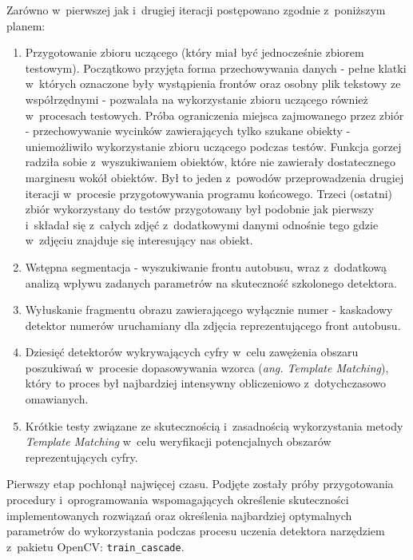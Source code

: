 Zarówno w~pierwszej jak i~drugiej iteracji postępowano
zgodnie z~poniższym planem:

\begin{enumerate}
    \item Przygotowanie zbioru uczącego (który miał być jednocześnie
        zbiorem testowym). Początkowo przyjęta forma przechowywania danych
        - pełne klatki w~których oznaczone były wystąpienia
        frontów oraz osobny plik tekstowy ze współrzędnymi -
        pozwalała na wykorzystanie zbioru uczącego również
        w~procesach testowych. 
        Próba ograniczenia miejsca zajmowanego przez zbiór -
        przechowywanie wycinków
        zawierających tylko szukane obiekty - 
        uniemożliwiło wykorzystanie zbioru uczącego podczas 
        testów. Funkcja
        gorzej radziła sobie z~wyszukiwaniem obiektów, które nie
        zawierały dostatecznego marginesu wokół obiektów.
        Był to jeden z~powodów przeprowadzenia drugiej iteracji
        w~procesie przygotowywania programu końcowego. Trzeci (ostatni)
        zbiór wykorzystany do testów przygotowany był podobnie 
        jak pierwszy i~składał się z~całych zdjęć z~dodatkowymi
        danymi odnośnie tego gdzie w~zdjęciu znajduje się interesujący
        nas obiekt.
    \item Wstępna segmentacja - wyszukiwanie frontu autobusu, wraz
        z~dodatkową analizą wpływu zadanych parametrów na skuteczność
        szkolonego detektora.
    \item Wyłuskanie fragmentu obrazu zawierającego wyłącznie numer -
        kaskadowy detektor numerów uruchamiany dla zdjęcia 
        reprezentującego front autobusu.
    \item Dziesięć detektorów wykrywających cyfry
        w~celu zawężenia obszaru poszukiwań w~procesie dopasowywania 
        wzorca (\textit{ang. Template Matching}), który to proces
        był najbardziej intensywny obliczeniowo z~dotychczasowo omawianych.
    \item Krótkie testy związane ze skutecznością i~zasadnością
        wykorzystania metody \textit{Template Matching} w~celu weryfikacji
        potencjalnych obszarów reprezentujących cyfry.
\end{enumerate}

Pierwszy etap pochłonął najwięcej czasu. Podjęte zostały próby 
przygotowania procedury i~oprogramowania wspomagających określenie
skuteczności implementowanych rozwiązań oraz określenia 
najbardziej optymalnych parametrów do wykorzystania podczas procesu
uczenia detektora narzędziem z~pakietu OpenCV: \verb|train_cascade|.


